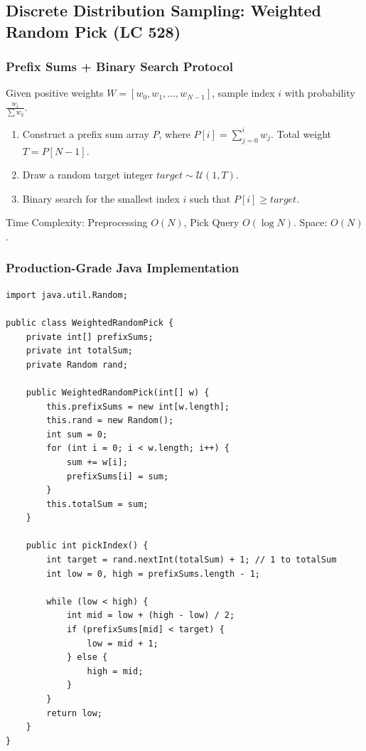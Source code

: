 \documentclass[10pt,journal,compsoc,onecolumn]{IEEEtran}
\begin{document}
\subsection{Discrete Distribution Sampling: Weighted Random Pick (LC 528)}

\subsubsection{Prefix Sums + Binary Search Protocol}
Given positive weights $W = [w_0, w_1, \dots, w_{N-1}]$, sample index $i$ with probability $\frac{w_i}{\sum w_k}$.
\begin{enumerate}
    \item Construct a prefix sum array $P$, where $P[i] = \sum_{j=0}^i w_j$. Total weight $T = P[N-1]$.
    \item Draw a random target integer $target \sim \mathcal{U}(1, T)$.
    \item Binary search for the smallest index $i$ such that $P[i] \ge target$.
\end{enumerate}
Time Complexity: Preprocessing $O(N)$, Pick Query $O(\log N)$. Space: $O(N)$.

\subsubsection{Production-Grade Java Implementation}

\begin{verbatim}
import java.util.Random;

public class WeightedRandomPick {
    private int[] prefixSums;
    private int totalSum;
    private Random rand;

    public WeightedRandomPick(int[] w) {
        this.prefixSums = new int[w.length];
        this.rand = new Random();
        int sum = 0;
        for (int i = 0; i < w.length; i++) {
            sum += w[i];
            prefixSums[i] = sum;
        }
        this.totalSum = sum;
    }

    public int pickIndex() {
        int target = rand.nextInt(totalSum) + 1; // 1 to totalSum
        int low = 0, high = prefixSums.length - 1;

        while (low < high) {
            int mid = low + (high - low) / 2;
            if (prefixSums[mid] < target) {
                low = mid + 1;
            } else {
                high = mid;
            }
        }
        return low;
    }
}
\end{verbatim}
\end{document}
